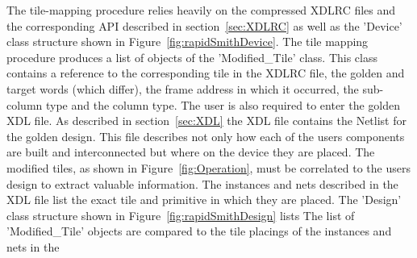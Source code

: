 The tile-mapping procedure relies heavily on the compressed XDLRC files and the corresponding \acrshort{API} described in section~\ref{sec:XDLRC} as well as the 'Device' class structure shown in Figure~\ref{fig:rapidSmithDevice}.
The tile mapping procedure produces a list of objects of the 'Modified\_Tile' class.
This class contains a reference to the corresponding tile in the XDLRC file, the \gls{golden} and \gls{target} words (which differ), the frame address in which it occurred, the sub-column type and the column type.
The user is also required to enter the \gls{golden} \acrshort{XDL} file.
As described in section~\ref{sec:XDL} the \acrshort{XDL} file contains the Netlist for the \gls{golden} design.
This file describes not only how each of the users components are built and interconnected but where on the device they are placed.
The modified tiles, as shown in Figure~\ref{fig:Operation}, must be correlated to the users design to extract valuable information.
The instances and nets described in the \acrshort{XDL} file list the exact tile and primitive in which they are placed.
The 'Design' class structure shown in Figure~\ref{fig:rapidSmithDesign} lists 
The list of 'Modified\_Tile' objects are compared to the tile placings of the instances and nets in the 

